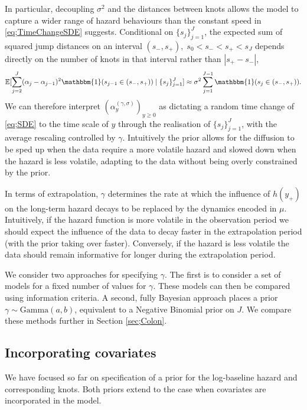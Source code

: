 \documentclass[ba,preprint]{imsart}
\theoremstyle{plain}
\theoremstyle{definition}
\theoremstyle{remark}
\begin{document}
{In particular, decoupling $\sigma^2$ and the distances between knots allows the model to capture a wider range of hazard behaviours than the constant speed in \eqref{eq;TimeChangeSDE} suggests. Conditional on $\{s_j\}_{j=1}^J$, the expected sum of squared jump distances on an interval $(s_-, s_+), \; s_0 < s_-<s_+<s_J$ depends directly on the number of knots in that interval rather than $|s_+-s_-|$,
\begin{equation*}
    \mathbb{E}[\sum_{j=2}^J(\alpha_j-\alpha_{j-1})^2\mathbbm{1}(s_{j-1} \in (s_-,s_+))\mid\{s_j\}_{j=1}^J] \approx \sigma^2\sum_{j=1}^{J-1} \mathbbm{1}(s_{j} \in (s_-,s_+)).
\end{equation*}
We can therefore interpret $(\alpha^{(\gamma,\sigma)}_y)_{y\geq 0}$ as dictating a random time change of \eqref{eq;SDE} to the time scale of $y$ through the realisation of $\{s_j\}_{j=1}^J$, with the average rescaling controlled by $\gamma$. Intuitively the prior allows for the diffusion to be sped up when the data require a more volatile hazard and slowed down when the hazard is less volatile, adapting to the data without being overly constrained by the prior. 

In terms of extrapolation, $\gamma$ determines the rate at which the influence of $h(y_+)$ on the long-term hazard decays to be replaced by the dynamics encoded in $\mu$. Intuitively, if the hazard function is more volatile in the observation period we should expect the influence of the data to decay faster in the extrapolation period (with the prior taking over faster). Conversely, if the hazard is less volatile the data should remain informative for longer during the extrapolation period.}

We consider two approaches for specifying $\gamma$. The first is to consider a set of models for a fixed number of values for $\gamma$. These models can then be compared using information criteria. A second, fully Bayesian approach places a prior $\gamma \sim \text{Gamma}(a,b)$, equivalent to a Negative Binomial prior on $J$. We compare these methods further in Section \ref{sec;Colon}.

\subsection{Incorporating covariates}
\label{sec;covariates}
We have focused so far on specification of a prior for the log-baseline hazard and corresponding knots. Both priors extend to the case when covariates are incorporated in the model. 
\end{document}
